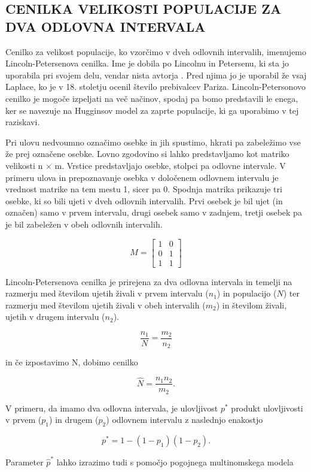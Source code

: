 \subsection{CENILKA VELIKOSTI POPULACIJE ZA DVA ODLOVNA INTERVALA}
Cenilko za velikost populacije, ko vzorčimo v dveh odlovnih intervalih, imenujemo Lincoln-Petersenova cenilka. Ime je dobila po Lincolnu in Petersenu, ki sta jo uporabila pri svojem delu, vendar nista avtorja \citep{williams_analysis_2002}. Pred njima jo je uporabil že vsaj Laplace, ko je v 18. stoletju ocenil število prebivalcev Pariza. Lincoln-Petersonovo cenilko je mogoče izpeljati na več načinov, spodaj pa bomo predstavili le enega, ker se navezuje na Hugginsov model za zaprte populacije, ki ga uporabimo v tej raziskavi.

Pri ulovu nedvoumno označimo osebke in jih spustimo, hkrati pa zabeležimo vse že prej označene osebke. Lovno zgodovino si lahko predstavljamo kot matriko velikosti n $\times$ m. Vrstice predstavljajo osebke, stolpci pa odlovne intervale. V primeru ulova in prepoznavanje osebka v določenem odlovnem intervalu je vrednost matrike na tem mestu 1, sicer pa 0. Spodnja matrika prikazuje tri osebke, ki so bili ujeti v dveh odlovnih intervalih. Prvi osebek je bil ujet (in označen) samo v prvem intervalu, drugi osebek samo v zadnjem, tretji osebek pa je bil zabeležen v obeh odlovnih intervalih.

\[
M = \begin{bmatrix}
1&0\\
0 & 1 \\
1 & 1
\end{bmatrix}
\]

Lincoln-Petersenova cenilka \citep{williams_analysis_2002} je prirejena za dva odlovna intervala in temelji na razmerju med številom ujetih živali v prvem intervalu ($n_1$) in populacijo ($N$) ter razmerju med številom ujetih živali v obeh intervalih ($m_2$) in številom živali, ujetih v drugem intervalu ($n_2$).

\[
\frac{n_1}{N} = \frac{m_2}{n_2}
\]

in če izpostavimo N, dobimo cenilko

\[
\hat{N} = \frac{n_1 n_2}{m_2}.
\]

V primeru, da imamo dva odlovna intervala, je ulovljivost $p^{*}$ produkt ulovljivosti v prvem ($p_1$) in drugem ($p_2$) odlovnem intervalu z naslednjo enakostjo

\[
p^* = 1 - (1-p_1)(1-p_2).
\]

Parameter $\hat{p}^{*}$ lahko izrazimo tudi s pomočjo pogojnega multinomskega modela

